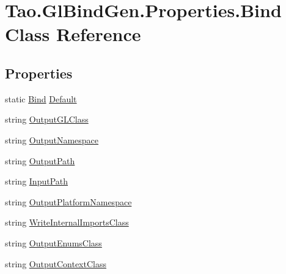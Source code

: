 \hypertarget{class_tao_1_1_gl_bind_gen_1_1_properties_1_1_bind}{
\section{Tao.GlBindGen.Properties.Bind Class Reference}
\label{class_tao_1_1_gl_bind_gen_1_1_properties_1_1_bind}
}
\subsection*{Properties}
\begin{DoxyCompactItemize}
\item 
static \hyperlink{class_tao_1_1_gl_bind_gen_1_1_properties_1_1_bind}{Bind} \hyperlink{class_tao_1_1_gl_bind_gen_1_1_properties_1_1_bind_a5d9d1341ed460e293563036534f57663}{Default}
\item 
string \hyperlink{class_tao_1_1_gl_bind_gen_1_1_properties_1_1_bind_a2cad1cba36a64d411bae76ddfbc9ee1a}{OutputGLClass}
\item 
string \hyperlink{class_tao_1_1_gl_bind_gen_1_1_properties_1_1_bind_afb90b3c0f202d2af0924ef5803a37df5}{OutputNamespace}
\item 
string \hyperlink{class_tao_1_1_gl_bind_gen_1_1_properties_1_1_bind_ae733aafaf1ae22b5cd6891aca1d7de13}{OutputPath}
\item 
string \hyperlink{class_tao_1_1_gl_bind_gen_1_1_properties_1_1_bind_a0441823f984f1d65b34c7c639b351df8}{InputPath}
\item 
string \hyperlink{class_tao_1_1_gl_bind_gen_1_1_properties_1_1_bind_a15f2e3b0f20d1f3cb941494dad332d1b}{OutputPlatformNamespace}
\item 
string \hyperlink{class_tao_1_1_gl_bind_gen_1_1_properties_1_1_bind_acd5042d86d1e6276191ea43639edf797}{WriteInternalImportsClass}
\item 
string \hyperlink{class_tao_1_1_gl_bind_gen_1_1_properties_1_1_bind_adcd8e65f3c73d4698ae2f243ffe0d0b1}{OutputEnumsClass}
\item 
string \hyperlink{class_tao_1_1_gl_bind_gen_1_1_properties_1_1_bind_afacf117e1e9ce262df39b1ae71e0451d}{OutputContextClass}
\end{DoxyCompactItemize}


